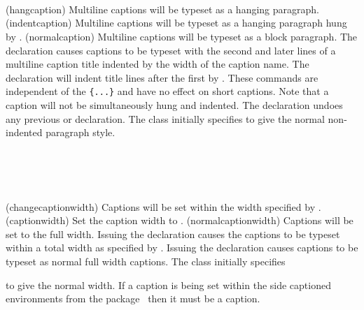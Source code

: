 \begin{syntax}
\cmd{\hangcaption} \\
\cmd{\indentcaption} \\
\cmd{\normalcaption} \\
\end{syntax}
\glossary(hangcaption)%
  {}%
  {Multiline captions will be typeset as a hanging paragraph.}
\glossary(indentcaption)%
  {}%
  {Multiline captions will be typeset as a hanging paragraph hung by .}
\glossary(normalcaption)%
  {}%
  {Multiline captions will be typeset as a block paragraph.}
 The declaration \cmd{\hangcaption} causes captions to be typeset with 
the second and later lines of a multiline 
caption title indented by 
the width of the caption name. 
The declaration \cmd{\indentcaption} will indent title lines after 
the first by . These commands are independent of 
the \cmd{\captionstyle}\verb?{...}? and have no effect on short captions.
Note that a caption will not 
be simultaneously hung and indented. The \cmd{\normalcaption} declaration 
undoes any previous \cmd{\hangcaption} or \cmd{\indentcaption} declaration.
The class initially specifies \cmd{\normalcaption} to give the normal 
 non-indented paragraph style.

\begin{syntax}
\cmd{\changecaptionwidth} \\
\cmd{\captionwidth} \\
\cmd{\normalcaptionwidth} \\
\end{syntax}
\glossary(changecaptionwidth)%
  {}%
  {Captions will be set within the width specified by .}
\glossary(captionwidth)%
  {}%
  {Set the caption width to .}
\glossary(normalcaptionwidth)%
  {}%
  {Captions will be set to the full width.}
   Issuing the declaration \cmd{\changecaptionwidth} causes the captions to
be typeset within a total width  
as specified by \cmd{\captionwidth}. 
Issuing the declaration \cmd{\normalcaptionwidth}
causes captions to be typeset as normal full width captions.
The class initially specifies
\begin{lcode}
\normalcaptionwidth
\captionwidth{\linewidth}
\end{lcode}
to give the normal width. If a caption is being set within the 
side captioned environments from 
the  package~\cite{SIDECAP}
then it must be a \cmd{\normalcaptionwidth} caption.

